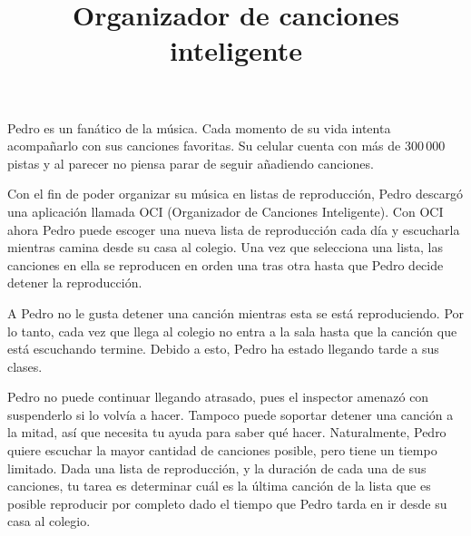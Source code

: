 \documentclass{oci}
\title{Organizador de canciones inteligente}
\begin{document}
\begin{problemDescription}
Pedro es un fanático de la música.
Cada momento de su vida intenta acompañarlo con sus canciones favoritas.
Su celular cuenta con más de 300\,000 pistas y al parecer no piensa parar de
seguir añadiendo canciones.

Con el fin de poder organizar su música en listas de reproducción, Pedro
descargó una aplicación llamada OCI (Organizador de Canciones Inteligente).
Con OCI ahora Pedro puede escoger una nueva lista de reproducción cada día y
escucharla mientras camina desde su casa al colegio.
Una vez que selecciona una lista, las canciones en ella se reproducen en orden
una tras otra hasta que Pedro decide detener la reproducción.

A Pedro no le gusta detener una canción mientras esta se está reproduciendo.
Por lo tanto, cada vez que llega al colegio no entra a la sala hasta que la
canción que está escuchando termine.
Debido a esto, Pedro ha estado llegando tarde a sus clases.

Pedro no puede continuar llegando atrasado, pues el inspector amenazó
con suspenderlo si lo volvía a hacer.
Tampoco puede soportar detener una canción a la mitad, así que necesita tu ayuda
para saber qué hacer.
Naturalmente, Pedro quiere escuchar la mayor cantidad de canciones posible,
pero tiene un tiempo limitado.
Dada una lista de reproducción, y la duración de cada una de sus canciones, tu
tarea es determinar cuál es la última canción de la lista que es posible
reproducir por completo dado el tiempo que Pedro tarda en ir desde su casa al
colegio.

\end{problemDescription}
\end{document}
